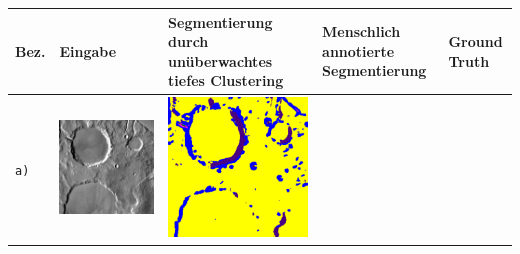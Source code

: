\begin{table}[h!]
	\setlength\tabcolsep{0pt}
	\begin{tabularx}{\textwidth}{>{\centering}m{}
			>{\centering}m{}
			>{\centering}m{}
			>{\centering}m{}
			>{\centering\arraybackslash}m{}}
		\toprule
		Bez. &
		Eingabe & 
		Segmentierung durch \textbf{unüberwachtes tiefes Clustering} &
		Menschlich annotierte Segmentierung &
		Ground Truth \\
		\midrule
		\texttt{a)} &
		\includegraphics[width=0.9\linewidth]{images/gen/results_robbins/input/thm_dir_N-30_210.png_sourcetile_60.png} &
		\includegraphics[width=0.9\linewidth]{images/gen/results_robbins/result/thm_dir_N-30_210.png_tile_60.png} &

\end{tabularx}
\end{table}
